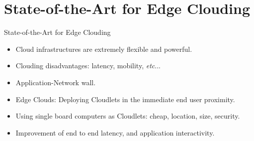 \documentclass{beamer}
\begin{document}
\section{State-of-the-Art for Edge Clouding}

\begin{frame}{State-of-the-Art for Edge Clouding}

\begin{block}{}
    \begin{itemize}
    \item Cloud infrastructures are extremely flexible and
powerful.
    \item<2->  Clouding disadvantages: latency, mobility, {\em etc}...
     \item<3-> Application-Network wall.
      \item<4-> Edge Clouds: Deploying Cloudlets in the immediate end user proximity.
      \item<5-> Using single board computers as Cloudlets: cheap, location, size, security.
      \item<6-> Improvement of end to end latency, and application interactivity. 
    \end{itemize}
    \end{block}

\end{frame}
\end{document}
